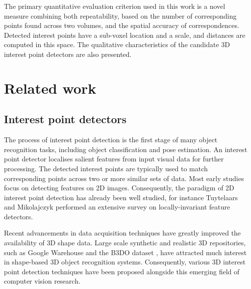 The primary quantitative evaluation criterion used in this work is a novel measure combining both repeatability, based on the number of corresponding points found across two volumes, and the spatial accuracy of correspondences. Detected interest points have a sub-voxel location and a scale, and distances are computed in this space. The qualitative characteristics of the candidate 3D interest point detectors are also presented. 

\section{Related work}
\label{sec/eval/relatedwork}

\subsection{Interest point detectors}

The process of interest point detection is the first stage of many object recognition tasks, including object classification and pose estimation. An interest point detector localises salient features from input visual data for further processing. The detected interest points are typically used to match corresponding points across two or more similar sets of data. 
Most early studies focus on detecting features on 2D images. Consequently, the paradigm of 2D interest point detection has already been well studied, for instance Tuytelaars and Mikolajczyk \cite{Tuytelaars2008} performed an extensive survey on locally-invariant feature detectors.  

Recent advancements in data acquisition techniques have greatly improved the availability of 3D shape data. Large scale synthetic and realistic 3D repositories, such as Google Warehouse \cite{Lai2010} and the B3DO dataset \cite{Janoch2011}, have attracted much interest in shape-based 3D object recognition systems. Consequently, various 3D interest point detection techniques have been proposed alongside this emerging field of computer vision research. 

